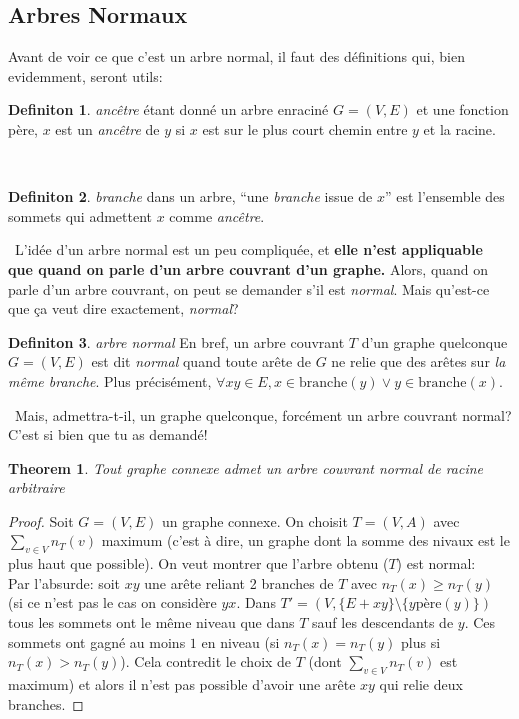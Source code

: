 \documentclass[french]{article}
\theoremstyle{definition}
\newtheorem{definition}{Definiton}[subsection]
\newtheorem{theorem}{Theorem}[section]
\begin{document}
		\subsection{Arbres Normaux}
		Avant de voir ce que c'est un arbre normal, il faut des définitions qui, bien evidemment, seront utils:
		\\
		\begin{definition}{\textit{ancêtre}}
			étant donné un arbre enraciné $G = (V, E)$ et une fonction père, $x$ est un \textit{ancêtre} de $y$ si $x$ est sur le plus court chemin entre $y$ et la racine.
		\end{definition}
		\
		\begin{definition}{\textit{branche}} 
				dans un arbre, ``une \textit{branche} issue de $x$'' est l'ensemble des sommets qui admettent $x$ comme \textit{ancêtre}.
		\end{definition}
		\
		L'idée d'un arbre normal est un peu compliquée, et \textbf{elle n'est appliquable que quand on parle d'un arbre couvrant d'un graphe.} Alors, quand on parle d'un arbre couvrant, on peut se demander s'il est \textit{normal}. Mais qu'est-ce que ça veut dire exactement, \textit{normal}?
		\\
		\begin{definition}{\textit{arbre normal}}
			En bref, un arbre couvrant $T$ d'un graphe quelconque $G = (V, E)$ est dit \textit{normal} quand toute arête de $G$ ne relie que des arêtes sur \textit{la même branche}. Plus précisément, $\forall xy \in E, x \in \text{branche}(y) \lor y \in \text{branche}(x)$.
		\end{definition}
		\
		Mais, admettra-t-il, un graphe quelconque, forcément un arbre couvrant normal? C'est si bien que tu as demandé! \\
		\begin{theorem}{\textit{Tout graphe connexe admet un arbre couvrant normal de racine arbitraire}}
			\begin{proof}
				Soit $G = (V, E)$ un graphe connexe. On choisit $T = (V, A)$ avec $\sum_{v \in V}n_T(v)$ maximum (c'est à dire, un graphe dont la somme des nivaux est le plus haut que possible). On veut montrer que l'arbre obtenu ($T$) est normal:\\
				Par l'absurde: soit $xy$ une arête reliant 2 branches de $T$ avec $n_T(x) \geq n_T(y)$ (si ce n'est pas le cas on considère $yx$. Dans $T' = (V, \{E + xy\} \setminus \{y\text{père}(y)\})$ tous les sommets ont le même niveau que dans $T$ sauf les descendants de $y$. Ces sommets ont gagné au moins $1$ en niveau (si $n_T(x) = n_T(y)$ plus si $n_T(x) > n_T(y)$). Cela contredit le choix de $T$ (dont $\sum_{v \in V}n_T(v)$ est maximum) et alors il n'est pas possible d'avoir une arête $xy$ qui relie deux branches.
			\end{proof}
		\end{theorem}
\end{document}
